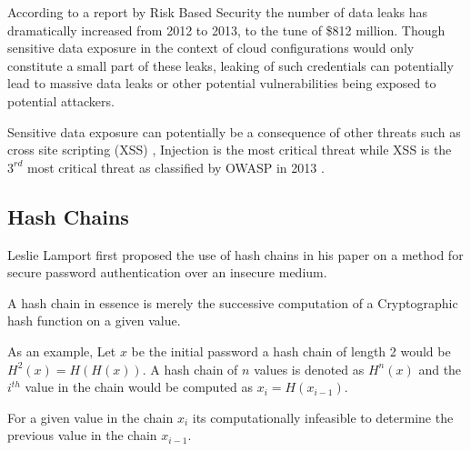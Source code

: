 \documentclass{sig-alternate-05-2015}
\begin{document}
According to a report by Risk Based Security \cite{risk_based_executives_2014} \cite{shu_privacy-preserving_2015} the number of data leaks has dramatically increased from 2012 to 2013, to the tune of \$812 million. Though sensitive data exposure in the context of cloud configurations would only constitute a small part of these leaks, leaking of such credentials can potentially lead to massive data leaks or other potential vulnerabilities being exposed to potential attackers.

Sensitive data exposure can potentially be a consequence of other threats such as cross site scripting (XSS) \cite{louw_blueprint:_2009}, Injection is the most critical threat while XSS is the $3^{rd}$ most critical threat as classified by OWASP in 2013 \cite{wichers_owasp_2014}. 

\subsection{Hash Chains \cite{horne_hash_2011}}

Leslie Lamport \cite{lamport_password_1981} first proposed the use of hash chains in his paper on a method for secure password authentication over an insecure medium.


A hash chain in essence is merely the successive computation of a Cryptographic hash function on a given value. 

As an example, Let $x$ be the initial password a hash chain of length 2 would be $H^{2}(x) = H(H(x))$. A hash chain of $n$ values is denoted as $H^{n}(x)$ and the $i^{th}$ value in the chain would be computed as $x_{i} = H(x_{i-1})$.

For a given value in the chain $x_{i}$ its computationally infeasible to determine the previous value in the chain $x_{i-1}$.

\end{document}
